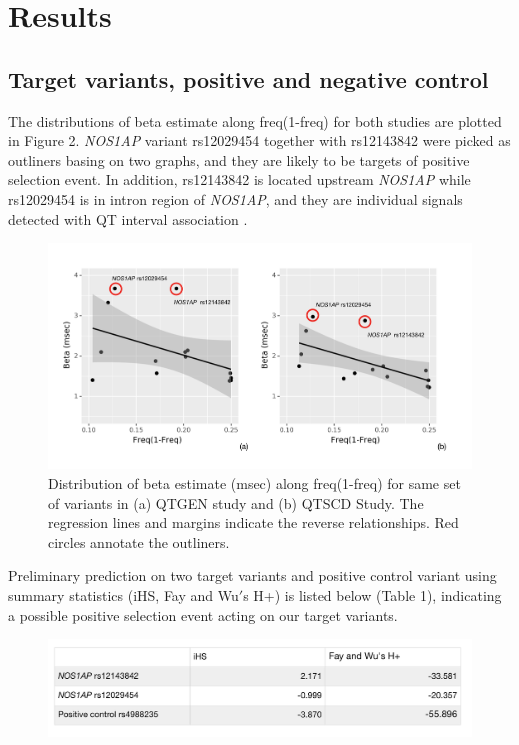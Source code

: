 \documentclass[a4paper,12pt,oneside]{extarticle}
\begin{document}
\cleardoublepage\clearpage
\section{Results}
\subsection{Target variants, positive and negative control}


The distributions of beta estimate along freq(1-freq) for both studies are plotted in Figure 2. \textit{NOS1AP} variant rs12029454 together with rs12143842 were picked as outliners basing on two graphs, and they are likely to be targets of positive selection event. In addition, rs12143842 is located upstream \textit{NOS1AP} while rs12029454 is in intron region of \textit{NOS1AP}, and they are individual signals detected with QT interval association \cite{4,5}.

\begin{figure}[H] 
  \captionsetup{singlelinecheck = false, justification=justified}
  \centering
  \includegraphics[trim = 0 5mm 0 5mm, clip,width=1\textwidth]{figure2.png}
  \caption{Distribution of beta estimate (msec) along freq(1-freq) for same set of variants in (a) QTGEN study and (b) QTSCD Study. The regression lines and margins indicate the reverse relationships. Red circles annotate the outliners.}
\end{figure}

Preliminary prediction on two target variants and positive control variant using summary statistics (iHS, Fay and Wu$'$s H+) is listed below (Table 1), indicating a possible positive selection event acting on our target variants.

\begin{figure}[H] 
  \captionsetup{singlelinecheck = false, justification=justified}
  \centering
  \includegraphics[trim = 0 5mm 0 5mm, clip,width=1\textwidth]{table1.png}
\end{figure}
\end{document}

